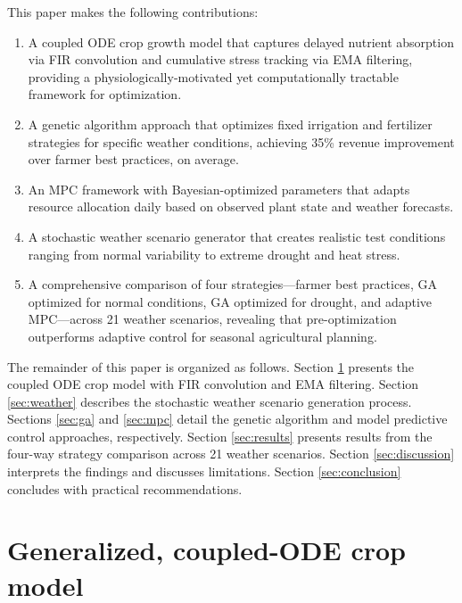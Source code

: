 \documentclass[pdflatex,sn-mathphys-num]{sn-jnl}
\begin{document}
This paper makes the following contributions:
\begin{enumerate}
\item A coupled ODE crop growth model that captures delayed nutrient absorption via FIR convolution and cumulative stress tracking via EMA filtering, providing a physiologically-motivated yet computationally tractable framework for optimization.
\item A genetic algorithm approach that optimizes fixed irrigation and fertilizer strategies for specific weather conditions, achieving 35\% revenue improvement over farmer best practices, on average.
\item An MPC framework with Bayesian-optimized parameters that adapts resource allocation daily based on observed plant state and weather forecasts.
\item A stochastic weather scenario generator that creates realistic test conditions ranging from normal variability to extreme drought and heat stress.
\item A comprehensive comparison of four strategies---farmer best practices, GA optimized for normal conditions, GA optimized for drought, and adaptive MPC---across 21 weather scenarios, revealing that pre-optimization outperforms adaptive control for seasonal agricultural planning.
\end{enumerate}

The remainder of this paper is organized as follows. Section \ref{sec:modeling} presents the coupled ODE crop model with FIR convolution and EMA filtering. Section \ref{sec:weather} describes the stochastic weather scenario generation process. Sections \ref{sec:ga} and \ref{sec:mpc} detail the genetic algorithm and model predictive control approaches, respectively. Section \ref{sec:results} presents results from the four-way strategy comparison across 21 weather scenarios. Section \ref{sec:discussion} interprets the findings and discusses limitations. Section \ref{sec:conclusion} concludes with practical recommendations.

\section{Generalized, coupled-ODE crop model}\label{sec:modeling}
\end{document}
